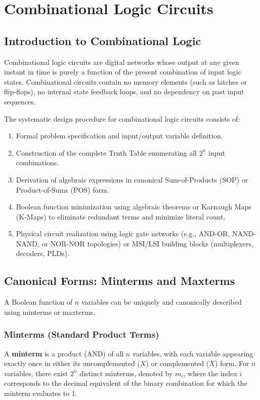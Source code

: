 \chapter{Combinational Logic Circuits}
\label{chap:combinational-logic}

\section{Introduction to Combinational Logic}
Combinational logic circuits are digital networks whose output at any given instant in time is purely a function of the present combination of input logic states. Combinational circuits contain no memory elements (such as latches or flip-flops), no internal state feedback loops, and no dependency on past input sequences.

The systematic design procedure for combinational logic circuits consists of:
\begin{enumerate}
    \item Formal problem specification and input/output variable definition.
    \item Construction of the complete Truth Table enumerating all $2^n$ input combinations.
    \item Derivation of algebraic expressions in canonical Sum-of-Products (SOP) or Product-of-Sums (POS) form.
    \item Boolean function minimization using algebraic theorems or Karnaugh Maps (K-Maps) to eliminate redundant terms and minimize literal count.
    \item Physical circuit realization using logic gate networks (e.g., AND-OR, NAND-NAND, or NOR-NOR topologies) or MSI/LSI building blocks (multiplexers, decoders, PLDs).
\end{enumerate}

\section{Canonical Forms: Minterms and Maxterms}
A Boolean function of $n$ variables can be uniquely and canonically described using minterms or maxterms.

\subsection{Minterms (Standard Product Terms)}
A \textbf{minterm} is a product (AND) of all $n$ variables, with each variable appearing exactly once in either its uncomplemented ($X$) or complemented ($\overline{X}$) form.
For $n$ variables, there exist $2^n$ distinct minterms, denoted by $m_i$, where the index $i$ corresponds to the decimal equivalent of the binary combination for which the minterm evaluates to 1.

